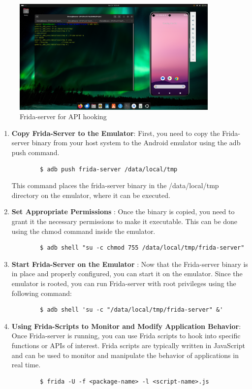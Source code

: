 \documentclass[a4paper,12pt]{article}
\begin{document}
\begin{figure}
    \centering
    \includegraphics[width=0.9\textwidth]{../images/running-frida-on-emulator.png}
    \caption{Frida-server for API hooking}
\end{figure}
\begin{enumerate}
    \item \textbf{Copy Frida-Server to the Emulator}: First, you need to copy the Frida-server binary from your host system to the Android emulator using the adb push command.
    \begin{verbatim}
        $ adb push frida-server /data/local/tmp
    \end{verbatim}
    This command places the frida-server binary in the /data/local/tmp directory on the emulator, where it can be executed.
    \item \textbf{Set Appropriate Permissions} : Once the binary is copied, you need to grant it the necessary permissions to make it executable. This can be done using the chmod command inside the emulator.
    \begin{verbatim}
        $ adb shell "su -c chmod 755 /data/local/tmp/frida-server"
    \end{verbatim}
    \item \textbf{Start Frida-Server on the Emulator} : Now that the Frida-server binary is in place and properly configured, you can start it on the emulator. Since the emulator is rooted, you can run Frida-server with root privileges using the following command:
    \begin{verbatim}
        $ adb shell 'su -c "/data/local/tmp/frida-server" &'
    \end{verbatim}
    \item \textbf{Using Frida-Scripts to Monitor and Modify Application Behavior}: Once Frida-server is running, you can use Frida scripts to hook into specific functions or APIs of interest. Frida scripts are typically written in JavaScript and can be used to monitor and manipulate the behavior of applications in real time.
    \begin{verbatim}
        $ frida -U -f <package-name> -l <script-name>.js
    \end{verbatim}
\end{enumerate}
\end{document}

